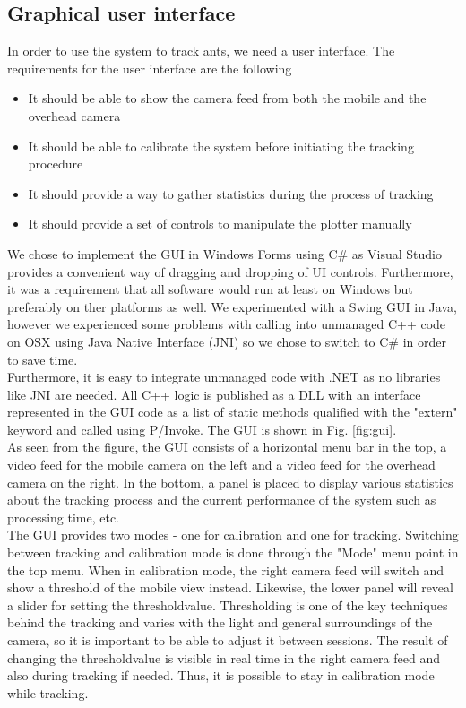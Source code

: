 
\subsection{Graphical user interface}

In order to use the system to track ants, we need a user interface. The requirements for the user interface are the following

\begin{itemize}
  \item{It should be able to show the camera feed from both the mobile and the overhead camera}
  \item{It should be able to calibrate the system before initiating the tracking procedure}
  \item{It should provide a way to gather statistics during the process of tracking}
  \item{It should provide a set of controls to manipulate the plotter manually}
\end{itemize}

We chose to implement the GUI in Windows Forms using C\# as Visual Studio provides a convenient way of dragging and dropping of UI controls. Furthermore, it was a requirement that all software would run at least on Windows but preferably on ther platforms as well. We experimented with a Swing GUI in Java, however we experienced some problems with calling into unmanaged C++ code on OSX using Java Native Interface (JNI) so we chose to switch to C\# in order to save time. \\

Furthermore, it is easy to integrate unmanaged code with .NET as no libraries like JNI are needed. All C++ logic is published as a DLL with an interface represented in the GUI code as a list of static methods qualified with the "extern" keyword and called using P/Invoke. The GUI is shown in Fig. \ref{fig:gui}. \\

As seen from the figure, the GUI consists of a horizontal menu bar in the top, a video feed for the mobile camera on the left and a video feed for the overhead camera on the right. In the bottom, a panel is placed to display various statistics about the tracking process and the current performance of the system such as processing time, etc. \\

The GUI provides two modes - one for calibration and one for tracking. Switching between tracking and calibration mode is done through the "Mode" menu point in the top menu. When in calibration mode, the right camera feed will switch and show a threshold of the mobile view instead. Likewise, the lower panel will reveal a slider for setting the thresholdvalue. Thresholding is one of the key techniques behind the tracking and varies with the light and general surroundings of the camera, so it is important to be able to adjust it between sessions. The result of changing the thresholdvalue is visible in real time in the right camera feed and also during tracking if needed. Thus, it is possible to stay in calibration mode while tracking. \\

